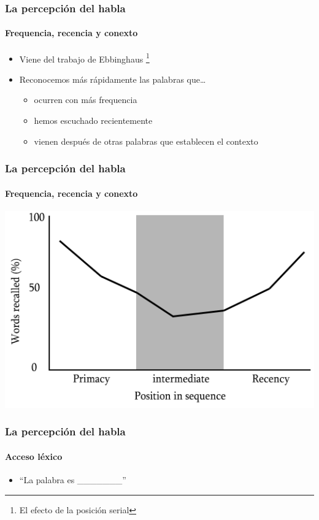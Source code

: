 \documentclass{beamer}
\begin{document}
\begin{frame} 
	\frametitle{La percepción del habla}
	\framesubtitle{Frequencia, recencia y conexto}
	
	\begin{itemize}
		\item Viene del trabajo de Ebbinghaus \footnote{El efecto de la posición serial}
		\item Reconocemos más rápidamente las palabras que\ldots 
		\begin{itemize}
			\item ocurren con más frequencia
			\item hemos escuchado recientemente 
			\item vienen después de otras palabras que establecen el contexto
		\end{itemize}
	\end{itemize}
\end{frame}

\begin{frame} 
	\frametitle{La percepción del habla}
	\framesubtitle{Frequencia, recencia y conexto}
	
	\begin{center}
		\includegraphics[width=.7\textwidth]{figures/serial_position.png}
	\end{center}
\end{frame}

\begin{frame} 
	\frametitle{La percepción del habla}
	\framesubtitle{Acceso léxico}
	
	\begin{itemize}
		\item ``La palabra es \_\_\_\_\_\_\_''
	\end{itemize}
\end{frame}
\end{document}
